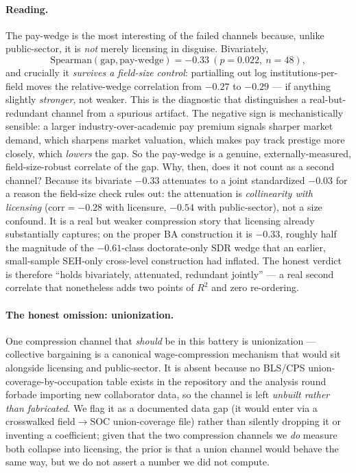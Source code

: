 \documentclass[11pt]{article}
\begin{document}
\paragraph{Reading.} The pay-wedge is the most interesting of the failed channels because, unlike public-sector, it is \emph{not} merely licensing in disguise. Bivariately,
\[
\mathrm{Spearman}(\mathrm{gap},\text{pay-wedge}) = -0.33\ (p=0.022,\ n=48),
\]
and crucially it \emph{survives a field-size control}: partialling out log institutions-per-field moves the relative-wedge correlation from $-0.27$ to $-0.29$ --- if anything slightly \emph{stronger}, not weaker. This is the diagnostic that distinguishes a real-but-redundant channel from a spurious artifact. The negative sign is mechanistically sensible: a larger industry-over-academic pay premium signals sharper market demand, which sharpens market valuation, which makes pay track prestige more closely, which \emph{lowers} the gap. So the pay-wedge is a genuine, externally-measured, field-size-robust correlate of the gap. Why, then, does it not count as a second channel? Because its bivariate $-0.33$ attenuates to a joint standardized $-0.03$ for a reason the field-size check rules out: the attenuation is \emph{collinearity with licensing} ($\mathrm{corr}=-0.28$ with licensure, $-0.54$ with public-sector), not a size confound. It is a real but weaker compression story that licensing already substantially captures; on the proper BA construction it is $-0.33$, roughly half the magnitude of the $-0.61$-class doctorate-only SDR wedge that an earlier, small-sample SEH-only cross-level construction had inflated. The honest verdict is therefore ``holds bivariately, attenuated, redundant jointly'' --- a real second correlate that nonetheless adds two points of $R^2$ and zero re-ordering.

\paragraph{The honest omission: unionization.} One compression channel that \emph{should} be in this battery is unionization --- collective bargaining is a canonical wage-compression mechanism that would sit alongside licensing and public-sector. It is absent because no BLS/CPS union-coverage-by-occupation table exists in the repository and the analysis round forbade importing new collaborator data, so the channel is left \emph{unbuilt rather than fabricated}. We flag it as a documented data gap (it would enter via a crosswalked field$\to$SOC union-coverage file) rather than silently dropping it or inventing a coefficient; given that the two compression channels we \emph{do} measure both collapse into licensing, the prior is that a union channel would behave the same way, but we do not assert a number we did not compute.
\end{document}
